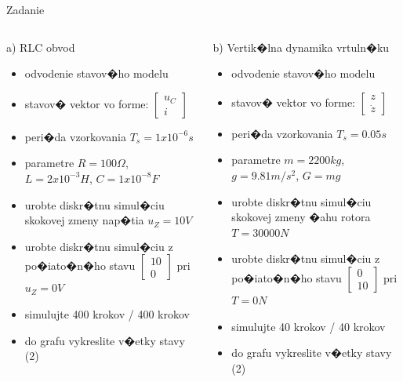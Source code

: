 \documentclass{beamer}
\begin{document}
\begin{frame}{Zadanie}
\begin{columns}[T]

\begin{column}{0.48\textwidth}
\centering a) RLC obvod
\footnotesize
\begin{itemize}
\item odvodenie stavov�ho modelu
\item stavov� vektor vo forme: $\begin{bmatrix} u_{C}\\ i \end{bmatrix}$
\item peri�da vzorkovania $T_{s} = 1x10^{-6}s$
\item parametre $R = 100\varOmega$, $L = 2x10^{-3}H$, $C = 1x10^{-8}F$
\item urobte diskr�tnu simul�ciu skokovej zmeny nap�tia $u_{Z} = 10V$
\item urobte diskr�tnu simul�ciu z po�iato�n�ho stavu $\begin{bmatrix} 10 \\ 0 \end{bmatrix}$ pri $u_{Z} = 0V$
\item simulujte 400 krokov / 400 krokov
\item do grafu vykreslite v�etky stavy (2)
\end{itemize}
\end{column}

\begin{column}{0.48\textwidth}
\centering b) Vertik�lna dynamika vrtuln�ku
\footnotesize
\begin{itemize}
\item odvodenie stavov�ho modelu
\item stavov� vektor vo forme: $\begin{bmatrix} z\\ \dot{z} \end{bmatrix}$
\item peri�da vzorkovania $T_{s} = 0.05s$
\item parametre $m = 2200kg$, $g = 9.81m/s^2$, $G = mg$
\item urobte diskr�tnu simul�ciu skokovej zmeny �ahu rotora $T = 30 000N$
\item urobte diskr�tnu simul�ciu z po�iato�n�ho stavu $\begin{bmatrix} 0 \\ 10 \end{bmatrix}$ pri $T = 0N$
\item simulujte 40 krokov / 40 krokov
\item do grafu vykreslite v�etky stavy (2)
\end{itemize}
\end{column}

\end{columns}
\end{frame}
\end{document}
